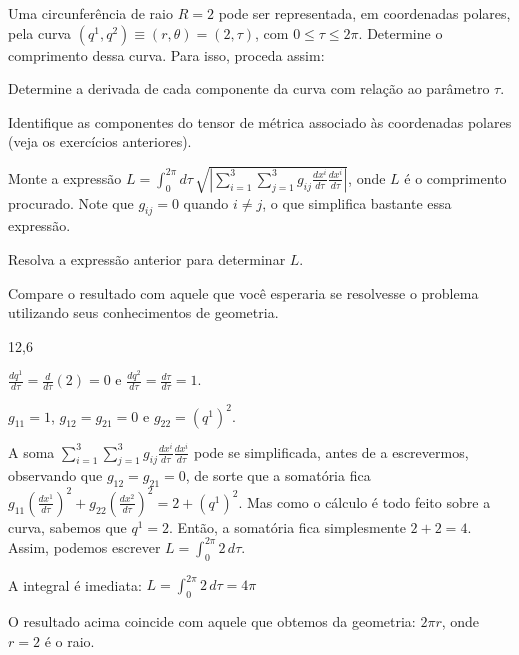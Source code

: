 \begin{question}
    Uma circunferência de raio $R = 2$ pode ser representada, em coordenadas polares, pela curva $(q^1, q^2) \equiv (r, \theta) = (2, \tau)$, com $0 \le \tau \le 2\pi$.
    Determine o comprimento dessa curva.
    Para isso, proceda assim: 
    \begin{compactenum}
      \item Determine a derivada de cada componente da curva com relação ao parâmetro $\tau$.
      \item Identifique as componentes do tensor de métrica associado às coordenadas polares (veja os exercícios anteriores).
      \item Monte a expressão $L = \int_0^{2\pi} d\tau\, \sqrt{\left|\sum_{i=1}^3\sum_{j=1}^3 g_{ij} \frac{dx^i}{d\tau} \frac{dx^i}{d\tau}\right|}$, onde $L$ é o comprimento procurado.
      Note que $g_{ij} = 0$ quando $i \ne j$, o que simplifica bastante essa expressão.
      \item Resolva a expressão anterior para determinar $L$.
      \item Compare o resultado com aquele que você esperaria se resolvesse o problema utilizando seus conhecimentos de geometria.
    \end{compactenum}

    \begin{answer}
      12,6
    \end{answer}

    \begin{solution}
      \begin{compactenum}
        \item $\frac{dq^1}{d\tau} = \frac{d}{d\tau}(2) = 0$ e $\frac{dq^2}{d\tau} = \frac{d\tau}{d\tau} = 1$.
        \item $g_{11} = 1$, $g_{12} = g_{21} = 0$ e $g_{22} = (q^1)^2$.
        \item A soma $\sum_{i=1}^3\sum_{j=1}^3 g_{ij} \frac{dx^i}{d\tau} \frac{dx^i}{d\tau}$ pode se simplificada, antes de a escrevermos, observando que $g_{12} = g_{21} = 0$, de sorte que a somatória fica $g_{11}\left(\frac{dx^1}{d\tau}\right)^2 + g_{22}\left(\frac{dx^2}{d\tau}\right)^2 = 2 + (q^1)^2$.
        Mas como o cálculo é todo feito sobre a curva, sabemos que $q^1 = 2$.
        Então, a somatória fica simplesmente $2 + 2 = 4$.
        Assim, podemos escrever $L = \int_{0}^{2\pi} 2\, d\tau$.
        \item A integral é imediata: $L = \int_{0}^{2\pi} 2\, d\tau = 4\pi$
        \item O resultado acima coincide com aquele que obtemos da geometria: $2\pi r$, onde $r = 2$ é o raio.
       \end{compactenum}
    \end{solution}
\end{question}